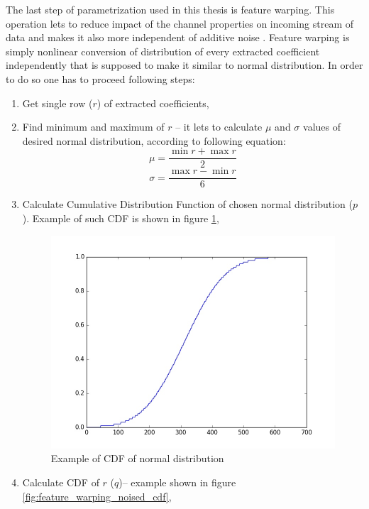 \documentclass[magister]{dyplom}
\begin{document}
	The last step of parametrization used in this thesis is feature warping. This operation lets to reduce impact of the channel properties on incoming stream of data and makes it also more independent of additive noise \cite{FeatureWarping}. Feature warping is simply nonlinear conversion of distribution of every extracted coefficient independently that is supposed to make it similar to normal distribution. In order to do so one has to proceed following steps:
	
	\begin{enumerate}
		\item Get single row ($r$) of extracted coefficients,
		\item Find minimum and maximum of $r$ -- it lets to calculate $\mu$ and $\sigma$ values of desired normal distribution, according to following equation:
		\begin{equation}
			\mu = \frac{\min r + \max r}{2}
		\end{equation}
		\begin{equation}
			\sigma = \frac{\max r - \min r}{6}
		\end{equation}
		\item Calculate Cumulative Distribution Function of chosen normal distribution ($p$). Example of such \gls{CDF} is shown in figure \ref{fig:feature_warping_norm_cdf},
		
		\begin{figure}[!th]
			\centering
			\includegraphics[width=0.7\linewidth]{images/feature_warping_norm_cdf}
			\caption{Example of \gls{CDF} of normal distribution}
			\label{fig:feature_warping_norm_cdf}
		\end{figure}
		
		\item Calculate \gls{CDF} of $r$ ($q$)-- example shown in figure \ref{fig:feature_warping_noised_cdf},


\end{enumerate}
\end{document}
